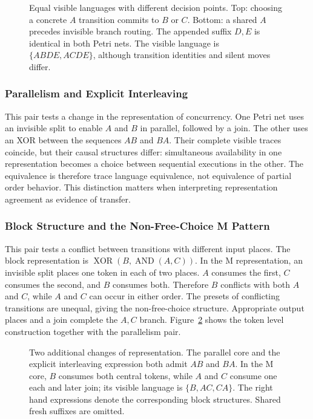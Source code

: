 \begin{figure}[!t]
\centering

\caption{Equal visible languages with different decision points. Top: choosing a concrete $A$ transition commits to $B$ or $C$. Bottom: a shared $A$ precedes invisible branch routing. The appended suffix $D,E$ is identical in both Petri nets. The visible language is $\{ABDE,ACDE\}$, although transition identities and silent moves differ.}
\label{fig:duplicatepair}
\end{figure}

\subsubsection{Parallelism and Explicit Interleaving}

This pair tests a change in the representation of concurrency. One Petri net uses an invisible split to enable $A$ and $B$ in parallel, followed by a join. The other uses an XOR between the sequences $AB$ and $BA$. Their complete visible traces coincide, but their causal structures differ: simultaneous availability in one representation becomes a choice between sequential executions in the other. The equivalence is therefore trace language equivalence, not equivalence of partial order behavior. This distinction matters when interpreting representation agreement as evidence of transfer.

\subsubsection{Block Structure and the Non-Free-Choice M Pattern}

This pair tests a conflict between transitions with different input places. The block representation is $\operatorname{XOR}(B,\operatorname{AND}(A,C))$. In the M representation, an invisible split places one token in each of two places. $A$ consumes the first, $C$ consumes the second, and $B$ consumes both. Therefore $B$ conflicts with both $A$ and $C$, while $A$ and $C$ can occur in either order. The presets of conflicting transitions are unequal, giving the non-free-choice structure. Appropriate output places and a join complete the $A,C$ branch. Figure~\ref{fig:structuralpairs} shows the token level construction together with the parallelism pair.

\begin{figure}[!t]
\centering

\caption{Two additional changes of representation. The parallel core and the explicit interleaving expression both admit $AB$ and $BA$. In the M core, $B$ consumes both central tokens, while $A$ and $C$ consume one each and later join; its visible language is $\{B,AC,CA\}$. The right hand expressions denote the corresponding block structures. Shared fresh suffixes are omitted.}
\label{fig:structuralpairs}
\end{figure}

